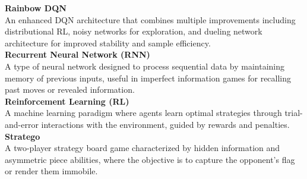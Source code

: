 \noindent\textbf{Rainbow DQN} \\
An enhanced DQN architecture that combines multiple improvements including distributional RL, noisy networks for exploration, and dueling network architecture for improved stability and sample efficiency. \\[6pt]

\noindent\textbf{Recurrent Neural Network (RNN)} \\
A type of neural network designed to process sequential data by maintaining memory of previous inputs, useful in imperfect information games for recalling past moves or revealed information. \\[6pt]

\noindent\textbf{Reinforcement Learning (RL)} \\
A machine learning paradigm where agents learn optimal strategies through trial-and-error interactions with the environment, guided by rewards and penalties. \\[6pt]

\noindent\textbf{Stratego} \\
A two-player strategy board game characterized by hidden information and asymmetric piece abilities, where the objective is to capture the opponent's flag or render them immobile. \\[6pt]